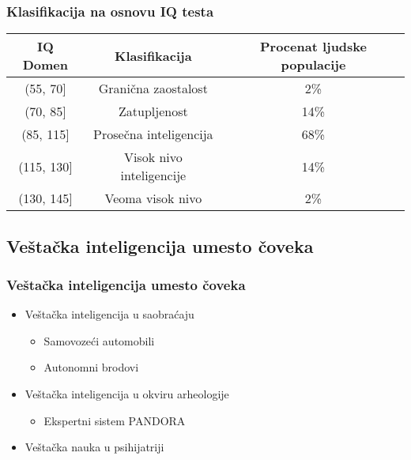 \documentclass{beamer}
\begin{document}
\begin{frame}[fragile]\frametitle{Klasifikacija na osnovu IQ testa}
\label{tab:tabelaIQ}
\begin{tabular}{|c|c|c|} \hline
IQ Domen & Klasifikacija & Procenat ljudske populacije\\ \hline
(55, 70]& Granična zaostalost & 2\%\\ \hline
(70, 85] & Zatupljenost & 14\%\\ \hline
(85, 115] & Prosečna inteligencija & 68\%\\ \hline
(115, 130] & Visok nivo inteligencije & 14\%\\ \hline
(130, 145] & Veoma visok nivo & 2\% \\ \hline
\end{tabular}

\subsection{Veštačka inteligencija umesto čoveka}
\begin{frame}[fragile]\frametitle{Veštačka inteligencija umesto čoveka}
\begin{itemize}
    \item Veštačka inteligencija u saobraćaju
    \begin{itemize}
        \item Samovozeći automobili
        \item Autonomni brodovi
    \end{itemize}
    \item Veštačka inteligencija u okviru arheologije
    \begin{itemize}
        \item Ekspertni sistem PANDORA
    \end{itemize}
    \item Veštačka nauka u psihijatriji
\end{itemize}

\end{frame}

\end{frame}
\end{document}
